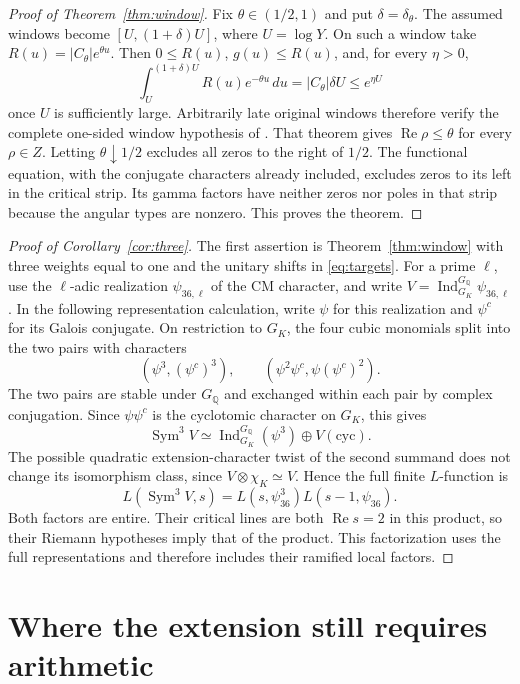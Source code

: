 \documentclass[11pt]{article}
\newcommand{\Q}{\mathbb Q}
\newcommand{\Rea}{\operatorname{Re}}
\theoremstyle{definition}
\theoremstyle{remark}
\begin{document}
\begin{proof}[Proof of Theorem~\ref{thm:window}]
Fix $\theta\in(1/2,1)$ and put $\delta=\delta_\theta$.
The assumed windows become $[U,(1+\delta)U]$, where $U=\log Y$.
On such a window take $R(u)=|C_\theta|e^{\theta u}$.
Then $0\leq R(u)$, $g(u)\leq R(u)$, and, for every $\eta>0$,
\[
 \int_U^{(1+\delta)U}R(u)e^{-\theta u}\,du
       =|C_\theta|\delta U\leq e^{\eta U}
\]
once $U$ is sufficiently large.  Arbitrarily late original windows
therefore verify the complete one-sided window hypothesis of
\cite[\texttt{Deduction.landau\_window}]{AlpogeWindow}.
That theorem gives $\Rea\rho\leq\theta$ for every $\rho\in Z$.
Letting $\theta\downarrow1/2$ excludes all zeros to the right of
$1/2$.  The functional equation, with the conjugate characters already
included, excludes zeros to its left in the critical strip.  Its gamma
factors have neither zeros nor poles in that strip because the angular
types are nonzero.  This proves the theorem.
\end{proof}

\begin{proof}[Proof of Corollary~\ref{cor:three}]
The first assertion is Theorem~\ref{thm:window} with three weights equal
to one and the unitary shifts in \eqref{eq:targets}.
For a prime $\ell$, use the $\ell$-adic realization $\psi_{36,\ell}$ of the CM character, and write $V=\operatorname{Ind}_{G_K}^{G_\Q}\psi_{36,\ell}$.  In the following representation calculation, write $\psi$ for this realization and $\psi^c$ for its Galois conjugate.
On restriction to $G_K$, the four cubic monomials split into the two
pairs with characters
\[
 (\psi^3,(\psi^c)^3),\qquad
 (\psi^2\psi^c,\psi(\psi^c)^2).
\]
The two pairs are stable under $G_\Q$ and exchanged within each pair by
complex conjugation.  Since $\psi\psi^c$ is the cyclotomic
character on $G_K$, this gives
\[
 \operatorname{Sym}^3V\simeq
 \operatorname{Ind}_{G_K}^{G_\Q}(\psi^3)\oplus V(\mathrm{cyc}).
\]
The possible quadratic extension-character twist of the second
summand does not change its isomorphism class, since
$V\otimes\chi_K\simeq V$.  Hence the full finite $L$-function is
\[
 L(\operatorname{Sym}^3V,s)
          =L(s,\psi_{36}^{3})L(s-1,\psi_{36}).
\]
Both factors are entire.  Their critical lines are both $\Rea s=2$
in this product, so their Riemann hypotheses imply that of the product.
This factorization uses the full representations and therefore includes
their ramified local factors.
\end{proof}

\section{Where the extension still requires arithmetic}
\end{document}

